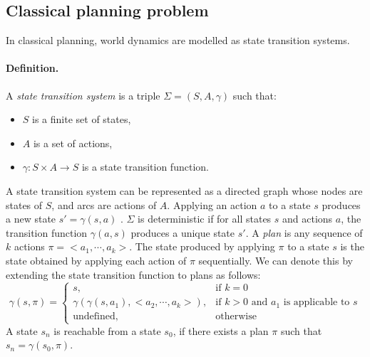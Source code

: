 \subsection{Classical planning problem}\label{subsec:Classical planning problem}
In classical planning, world dynamics are modelled as state transition systems.

\paragraph{Definition.}
A \textit{state transition system} is a triple $\Sigma = (S, A, \gamma)$ such that:
\begin{itemize}
\item $S$ is a finite set of states,
\item $A$ is a set of actions,
\item $\gamma : S \times A \rightarrow S$ is a state transition function.
\end{itemize}

\noindent A state transition system can be represented as a directed graph whose nodes are states of $S$, and arcs are actions of $A$. 
Applying an action $a$ to a state $s$ produces a new state $s'= \gamma(s,a)$ 
. 
$\Sigma$ is deterministic if for all states $s$ and actions $a$, the transition function $\gamma(a, s)$ produces a unique state $s'$. 
A \textit{plan} is any sequence of $k$ actions $\pi = <a_1,\cdots, a_k>$. The state produced by applying $\pi$ to a state $s$ is the state obtained by applying each action of $\pi$ sequentially. 
We can denote this by extending the state transition function to plans as follows:
\[\gamma(s,\pi)=\left\{
\begin{array}{ll}
   s, &\mbox{if $k=0$} \\
   \gamma(\gamma(s,a_1),<a_2,\cdots, a_k>), &\mbox{if $k>0$ and $a_1$ is applicable to $s$} \\
   \mbox{undefined}, &\mbox{otherwise}
\end{array}
\right.
\]
A state $s_n$ is reachable from a state $s_0$, if there exists a plan $\pi$ such that $s_{n} = \gamma(s_0, \pi)$.\\


